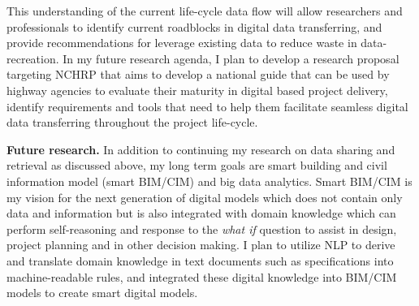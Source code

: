 \documentclass[a4paper,11pt]{article}
\begin{document}
%
%
This understanding of the current life-cycle data flow will allow researchers and professionals to identify current roadblocks in digital data transferring, and provide recommendations for leverage existing data to reduce waste in data-recreation. 
%
In my future research agenda, I plan to develop a research proposal targeting NCHRP that aims to develop a national guide that can be used by highway agencies to evaluate their maturity in digital based project delivery, identify requirements and tools that need to help them facilitate seamless digital data transferring throughout the project life-cycle.  
%
%
\par
{\bf Future research.} In addition to continuing my research on data sharing and retrieval as discussed above, my long term goals are smart building and civil information model (smart BIM/CIM) and big data analytics. Smart BIM/CIM is my vision for the next generation of digital models which does not contain only data and information but is also integrated with domain knowledge which can perform self-reasoning and response to the {\it what if} question to assist in design, project planning and in other decision making.
%
I plan to utilize NLP to derive and translate domain knowledge in text documents such as specifications into machine-readable rules, and integrated these digital knowledge into BIM/CIM models to create smart digital models. 
\end{document}
